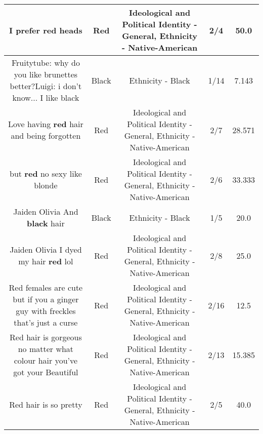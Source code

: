 \documentclass[11pt]{article}
\newlength\mylength
\begin{document}
\begin{center}
\begin{longtable}{|C{.65\mylength}|C{.30\mylength}|C{.12\mylength}|C{.12\mylength}|C{.12\mylength}|}
  \small I prefer \textbf{r\textbf{ed}} heads\normalsize   & Red &  Ideological and Political Identity - General, Ethnicity - Native-American & 2/4 & 50.0 \\  \hline
  \small Fruitytube: why do you like brunettes better?Luigi: i don't know... I like black\normalsize   & Black & Ethnicity - Black & 1/14 & 7.143 \\  \hline
  \small Love having \textbf{r\textbf{ed}} hair and being forgotten\normalsize   & Red &  Ideological and Political Identity - General, Ethnicity - Native-American & 2/7 & 28.571 \\  \hline
  \small but \textbf{r\textbf{ed}} no sexy like blonde\normalsize   & Red &  Ideological and Political Identity - General, Ethnicity - Native-American & 2/6 & 33.333 \\  \hline
  \small Jaiden Olivia And \textbf{black} hair\normalsize   & Black & Ethnicity - Black & 1/5 & 20.0 \\  \hline
  \small Jaiden Olivia I dyed my hair \textbf{r\textbf{ed}} lol\normalsize   & Red &  Ideological and Political Identity - General, Ethnicity - Native-American & 2/8 & 25.0 \\  \hline
  \small Red females are cute but if you a ginger guy with freckles that's just a curse\normalsize   & Red &  Ideological and Political Identity - General, Ethnicity - Native-American & 2/16 & 12.5 \\  \hline
  \small Red hair is gorgeous no matter what colour hair you've got your Beautiful\normalsize   & Red &  Ideological and Political Identity - General, Ethnicity - Native-American & 2/13 & 15.385 \\  \hline
  \small Red hair is so pretty\normalsize   & Red &  Ideological and Political Identity - General, Ethnicity - Native-American & 2/5 & 40.0 \\  \hline

\end{longtable}
\end{center}
\end{document}
